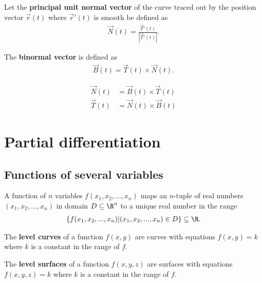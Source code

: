 \documentclass{article}
\begin{document}
\begin{definition}
    Let the \textbf{principal unit normal vector} of the curve traced out by the position vector $\vec r(t)$
    where $\vec r'(t)$ is smooth be defined as
    \begin{align*}
        \vec N (t) = \frac{\vec T'(t)}{\left| \vec T'(t) \right|}.
    \end{align*}
\end{definition}
\begin{definition}
    The \textbf{binormal vector} is defined as
    \begin{align*}
        \vec B(t) = \vec T(t) \times \vec N(t).
    \end{align*}
\end{definition}
\begin{theorem}
    \begin{align*}
        \vec N(t) & = \vec B(t) \times \vec T(t) \\
        \vec T(t) & = \vec N(t) \times \vec B(t)
    \end{align*}
\end{theorem}



\section{Partial differentiation}



\subsection{Functions of several variables}


\begin{definition}
    A function of $n$ variables $f(x_1, x_2, ..., x_n)$ maps an $n$-tuple
    of real numbers $(x_1, x_2, ..., x_n)$ in domain $D\subseteq\R^n$ to
    a unique real number in the range
    \begin{align*}
        \{f(x_1, x_2, ..., x_n)|(x_1, x_2, ..., x_n)\in D\} \subseteq \R.
    \end{align*}
\end{definition}
\begin{definition}
    The \textbf{level curves} of a function $f(x,y)$ are curves with equations
    $f(x,y)=k$ where $k$ is a constant in the range of $f$.
\end{definition}
\begin{definition}
    The \textbf{level surfaces} of a function $f(x,y,z)$ are surfaces with
    equations $f(x,y,z)=k$ where $k$ is a constant in the range of $f$.
\end{definition}
\end{document}
